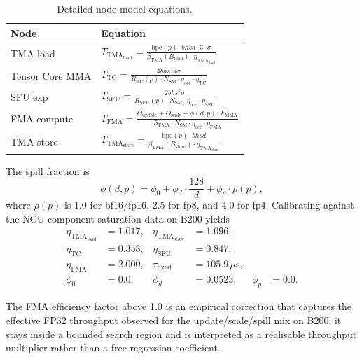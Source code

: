 \documentclass[
  10pt,journal,compsoc,twoside]{IEEEtran}
\begin{document}
\begin{table}[t]
\centering
\caption{Detailed-node model equations.}
\label{tab:detailed-node-equations}
\small
\begin{tabularx}{\columnwidth}{@{}l X@{}}
\hline
Node & Equation \\
\hline
TMA load & $T_{\text{TMA}_{\text{load}}} = \frac{\text{bpe}(p) \cdot b h s d \cdot 3 \cdot \sigma}{\beta_{\text{TMA}}(B_{\text{load}}) \cdot \eta_{\text{TMA}_{\text{load}}}}$ \\
Tensor Core MMA & $T_{\text{TC}} = \frac{4 b h s^2 d \sigma}{R_{\text{TC}}(p) \cdot N_{\text{SM}} \cdot \eta_{\text{occ}} \cdot \eta_{\text{TC}}}$ \\
SFU exp & $T_{\text{SFU}} = \frac{2 b h s^2 \sigma}{R_{\text{SFU}}(p) \cdot N_{\text{SM}} \cdot \eta_{\text{occ}} \cdot \eta_{\text{SFU}}}$ \\
FMA compute & $T_{\text{FMA}} = \frac{O_{\text{update}} + O_{\text{scale}} + \phi(d, p) \cdot F_{\text{MMA}}}{R_{\text{FMA}} \cdot N_{\text{SM}} \cdot \eta_{\text{occ}} \cdot \eta_{\text{FMA}}}$ \\
TMA store & $T_{\text{TMA}_{\text{store}}} = \frac{\text{bpe}(p) \cdot b h s d}{\beta_{\text{TMA}}(B_{\text{store}}) \cdot \eta_{\text{TMA}_{\text{store}}}}$ \\
\hline
\end{tabularx}
\end{table}

The spill fraction is
\[\phi(d, p) = \phi_0 + \phi_d \cdot \frac{128}{d} + \phi_p \cdot \rho(p),
\] where \(\rho(p)\) is 1.0 for bf16/fp16, 2.5 for fp8, and 4.0 for fp4.
Calibrating against the NCU component-saturation data on B200 yields
\[\begin{aligned}
\eta_{\text{TMA}_{\text{load}}} &= 1.017, & \eta_{\text{TMA}_{\text{store}}} &= 1.096, \\
\eta_{\text{TC}} &= 0.358, & \eta_{\text{SFU}} &= 0.847, \\
\eta_{\text{FMA}} &= 2.000, & \tau_{\text{fixed}} &= 105.9\,\mu\text{s}, \\
\phi_0 &= 0.0, & \phi_d &= 0.0523, & \phi_p &= 0.0.
\end{aligned}\]

The FMA efficiency factor above 1.0 is an empirical correction that
captures the effective FP32 throughput observed for the
update/scale/spill mix on B200; it stays inside a bounded search region
and is interpreted as a realisable throughput multiplier rather than a
free regression coefficient.
\end{document}
